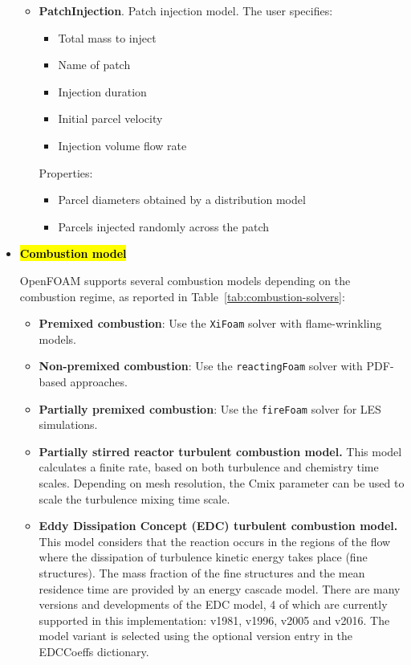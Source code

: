 \documentclass[12pt]{article}
\begin{document}
\begin{itemize}
\begin{itemize}
        \item \textbf{PatchInjection}.
        Patch injection model.
        The user specifies:
        \begin{itemize}
            \item Total mass to inject
            \item Name of patch
            \item Injection duration
            \item Initial parcel velocity
            \item Injection volume flow rate
        \end{itemize}
        Properties:
        \begin{itemize}
            \item Parcel diameters obtained by a distribution model
            \item Parcels injected randomly across the patch
        \end{itemize}
    \end{itemize}
%
    \item{\hl{\textbf{Combustion model}}}
    
    OpenFOAM supports several combustion models depending on the combustion regime, as reported in Table~\ref{tab:combustion-solvers}:
    \begin{itemize}
    \item \textbf{Premixed combustion}: Use the \texttt{XiFoam} solver with flame-wrinkling models.
    \item \textbf{Non-premixed combustion}: Use the \texttt{reactingFoam} solver with PDF-based approaches.
    \item \textbf{Partially premixed combustion}: Use the \texttt{fireFoam} solver for LES simulations.
    \item  \textbf{Partially stirred reactor turbulent combustion model.}  This model calculates a finite rate, based on both turbulence and chemistry time scales. Depending on mesh resolution, the Cmix parameter can be used
    to scale the turbulence mixing time scale.
    \item \textbf{Eddy Dissipation Concept (EDC) turbulent combustion model.}
    This model considers that the reaction occurs in the regions of the flow
    where the dissipation of turbulence kinetic energy takes place (fine
    structures). The mass fraction of the fine structures and the mean residence
    time are provided by an energy cascade model.
%
    There are many versions and developments of the EDC model, 4 of which are
    currently supported in this implementation: v1981, v1996, v2005 and
    v2016.  The model variant is selected using the optional version entry in
    the EDCCoeffs dictionary.
\end{itemize}


\end{itemize}
\end{document}
